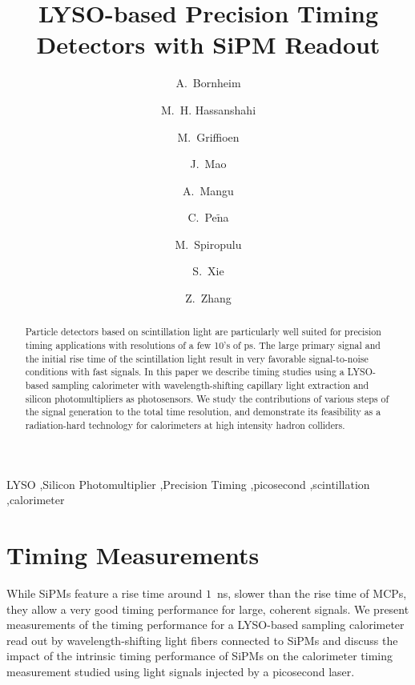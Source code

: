 \documentclass[preprint,1p]{elsarticle}
\begin{document}
  
\linenumbers

\begin{frontmatter}

\title{LYSO-based Precision Timing Detectors with SiPM Readout}

\author[1]{A.~Bornheim}
\author[2]{M.~H. Hassanshahi}
\author[1]{M.~Griffioen}
\author[1]{J.~Mao}
\author[1]{A.~Mangu}
\author[1]{C.~Pe$\tilde{\mathrm{n}}$a}
\author[1]{M.~Spiropulu}
\author[1]{S.~Xie }
\author[1]{Z.~Zhang}
\address[1]{California Institute of Technology, Pasadena, CA, USA}
\address[2]{Institute for Research in Fundamental Science, Tehran, Iran}


\begin{abstract}
Particle detectors based on scintillation light are particularly well suited for precision timing applications with 
resolutions of a few 10's of ps. The large primary signal and the initial rise time of the scintillation
light result in very favorable signal-to-noise conditions with fast signals. In this paper we describe timing 
studies using a LYSO-based sampling calorimeter with wavelength-shifting capillary light extraction and silicon
photomultipliers as photosensors. We study the contributions of various steps of the signal generation to 
the total time resolution, and demonstrate its feasibility as a radiation-hard technology for calorimeters
at high intensity hadron colliders.
\end{abstract}

\begin{keyword}
LYSO \sep Silicon Photomultiplier \sep Precision Timing \sep picosecond \sep scintillation \sep calorimeter
\end{keyword}

\end{frontmatter}

%
%

%
%
  
%
%
  
%
%

\section{Timing Measurements} 

While SiPMs feature a rise time around $1$~ns, slower than the rise time of MCPs, they
allow a very good timing performance for large, coherent signals. We present 
measurements of the timing performance for a
LYSO-based sampling calorimeter read out by wavelength-shifting light fibers
connected to SiPMs and discuss the impact of
the intrinsic timing performance of SiPMs on the calorimeter timing measurement
studied using light signals injected by a picosecond laser.
\end{document}
